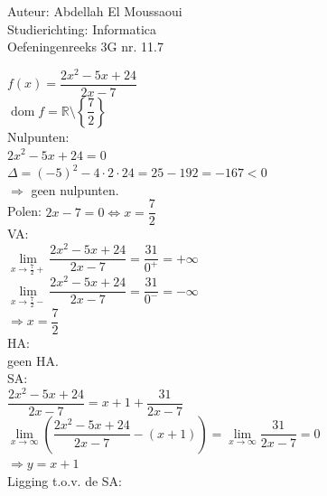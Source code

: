 \documentclass[a4paper]{article}
\begin{document}
  
\noindent \large Auteur: Abdellah El Moussaoui \\
\noindent \large Studierichting: Informatica\\
\noindent \large Oefeningenreeks 3G nr. 11.7\\

\medskip

\normalsize

$f(x) = \dfrac{2x^2 -5x +24}{2x - 7}$ \\

$\operatorname{dom}f = \mathbb{R}\setminus\left\{\dfrac{7}{2}\right\}$ \\

Nulpunten: \\

$2x^2 - 5x + 24 = 0$ \\

$\Delta = (-5)^2 - 4\cdot2\cdot24 = 25 - 192 = -167 < 0$ \\

$\Rightarrow$ geen nulpunten. \\

Polen: $2x - 7 = 0 \Leftrightarrow x = \dfrac{7}{2}$ \\

VA: \\

$\lim\limits_{x\to\tfrac{7}{2}+}\dfrac{2x^2 -5x +24}{2x - 7} = \dfrac{31}{0^+} = +\infty$ \\

$\lim\limits_{x\to\tfrac{7}{2}-}\dfrac{2x^2 -5x +24}{2x - 7} = \dfrac{31}{0^-} = -\infty$ \\

$\Rightarrow x = \dfrac{7}{2}$ \\

HA: \\

geen HA. \\

SA: \\

$\dfrac{2x^2 -5x +24}{2x - 7} = x + 1 + \dfrac{31}{2x - 7}$ \\

$\lim\limits_{x\to\infty}\left(\dfrac{2x^2 -5x +24}{2x - 7} - (x + 1)\right) = \lim\limits_{x\to\infty}\dfrac{31}{2x - 7} = 0$ \\

$\Rightarrow y = x + 1$ \\

Ligging t.o.v. de SA: \\
\end{document}
